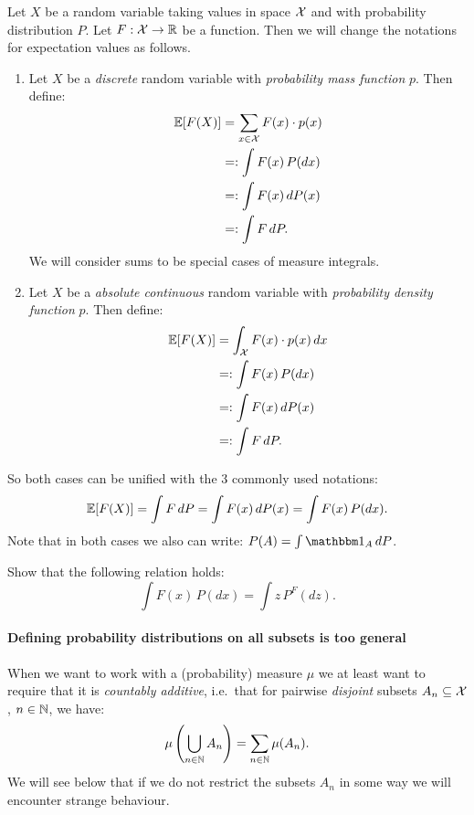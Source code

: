 \begin{Not}%
    Let $X$ be a  random variable taking values in space $\mathcal{X}$ and with probability distribution $P$.
    Let $F: \mathcal{X} \to \mathbb{R}$ be a function. Then we will change the notations for expectation values as follows.
 \begin{enumerate}
     \item Let $X$ be a \emph{discrete} random variable with \emph{probability mass function} $p$. Then define:
 \begin{align*}
     \mathbb{E}[F(X)] &= \sum_{x \in \mathcal{X}} F(x) \cdot p(x) \\
         &=: \int F(x)  \, P(dx)\\
         &=: \int F(x)  \, dP(x)\\
         &=: \int F  \, dP.
 \end{align*}
  We will consider sums to be special cases of measure integrals.
     \item Let $X$ be a \emph{absolute continuous} random variable with \emph{probability density function} $p$. Then define:
 \begin{align*}
     \mathbb{E}[F(X)] &= \int_{\mathcal{X}} F(x) \cdot p(x)\,dx \\
         &=: \int F(x)  \, P(dx)\\
         &=: \int F(x)  \, dP(x)\\
         &=: \int F  \, dP.
 \end{align*}
 \end{enumerate}
 So both cases can be unified with the 3 commonly used notations:
 \[ \mathbb{E}[F(X)] = \int F\,dP = \int F(x)\,dP(x) = \int F(x)\,P(dx).  \]
 Note that in both cases we also can write: $P(A) = \int \I_A \, dP$.
\end{Not}

\begin{Exc}
    Show that the following relation holds:
    \[ \int F(x)\,P(dx) = \int z \,P^F(dz).\]
\end{Exc}

\paragraph*{Defining probability distributions on all subsets is too general}%

\begin{Rem}\label{rem-power-set}
    When we want to work with a (probability) measure $\mu$ we at least want to require that it is \emph{countably additive}, i.e.\ that for pairwise \emph{disjoint} subsets $A_n \subseteq \mathcal{X}$, $n \in \mathbb{N}$, we have:
    \[\mu\left (\bigcup_{n \in \mathbb{N}} A_n\right ) = \sum_{n \in \mathbb{N}} \mu(A_n).\]
    We will see below that if we do not restrict the subsets $A_n$ in some way we will encounter strange behaviour.
\end{Rem}

